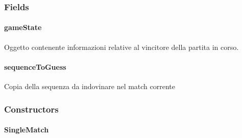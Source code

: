 \documentclass[letterpaper,10pt,italian,openany,oneside]{sphinxmanual}
\begin{document}
\subsubsection{Fields}
\label{\detokenize{source/it/unicam/cs/pa/mastermind/gamecore/SingleMatch:fields}}

\paragraph{gameState}
\label{\detokenize{source/it/unicam/cs/pa/mastermind/gamecore/SingleMatch:gamestate}}

\begin{fulllineitems}
\label{\detokenize{source/it/unicam/cs/pa/mastermind/gamecore/SingleMatch:it.unicam.cs.pa.mastermind.gamecore.SingleMatch.gameState}}
Oggetto contenente informazioni relative al vincitore della partita in corso.

\end{fulllineitems}



\paragraph{sequenceToGuess}
\label{\detokenize{source/it/unicam/cs/pa/mastermind/gamecore/SingleMatch:sequencetoguess}}

\begin{fulllineitems}
\label{\detokenize{source/it/unicam/cs/pa/mastermind/gamecore/SingleMatch:it.unicam.cs.pa.mastermind.gamecore.SingleMatch.sequenceToGuess}}
Copia della sequenza da indovinare nel match corrente

\end{fulllineitems}



\subsubsection{Constructors}
\label{\detokenize{source/it/unicam/cs/pa/mastermind/gamecore/SingleMatch:constructors}}

\paragraph{SingleMatch}
\label{\detokenize{source/it/unicam/cs/pa/mastermind/gamecore/SingleMatch:id1}}
\end{document}
